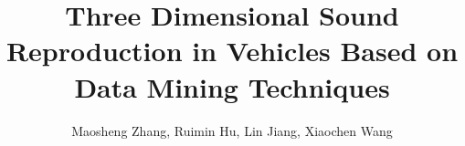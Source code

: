 \documentclass[runningheads,a4paper]{llncs}
\begin{document}

\title{ Three Dimensional Sound Reproduction in Vehicles Based on Data Mining Techniques }

%
%
\author{Maosheng Zhang, Ruimin Hu, Lin Jiang, Xiaochen Wang}
%
\address{National Engineering Research Center for Multimedia Software\\
School of Computer Science \\
Wuhan University, Bayi road, Wuhan, China\\
}
%

\maketitle
\end{document}
